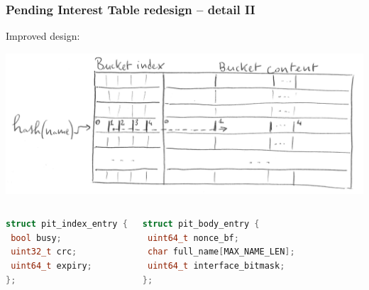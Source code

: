 \begin{frame}[fragile]
  \frametitle{Pending Interest Table redesign -- detail II}
  Improved design:
  \begin{center}
    \includegraphics[width=.9\linewidth]{img/new_pit_sketch_trans.png}
  \end{center}
  \vspace{-.8cm}
  \begin{columns}[t]
    \begin{lstlisting}[language=c,escapechar=\%]
struct pit_index_entry {
 bool busy;
 uint32_t crc;
 uint64_t expiry;
};
    \end{lstlisting}
    \begin{lstlisting}[language=c,escapechar=\%]
struct pit_body_entry {
 uint64_t nonce_bf;
 char full_name[MAX_NAME_LEN];
 uint64_t interface_bitmask;
};
    \end{lstlisting}
  \end{columns}
\end{frame}

